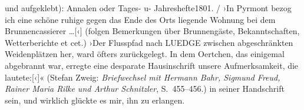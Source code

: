{{{                        und aufgeklebt): Annalen oder Tages- u-
                           Jahreshefte1801.{ / }›In Pyrmont bezog ich eine schöne ruhige gegen das
                           Ende des Orts liegende Wohnung bei dem Brunnencassierer {\dots}{[}‹{]} (folgen Bemerkungen über Brunnengäste,
                           Bekanntschaften, Wetterberichte et cet.) ›Der Flusspfad nach LUEDGE zwischen abgeschränkten Weidenplätzen her, ward öfters
                           zurückgelegt. In dem Oertchen, das einigemal abgebrannt war, erregte eine
                           desparate Hausinschrift unsere Aufmerksamkeit, die
                              lautete:{[}‹{]}« (Stefan Zweig: \emph{Briefwechsel mit Hermann Bahr, Sigmund Freud, Rainer Maria Rilke und Arthur
                        Schnitzler}, S. 455–456.)}}}\label{K_L03626-3} in seiner Handschrift sein,
               und wirklich glückte es mir, ihn zu erlangen.\pend
           
